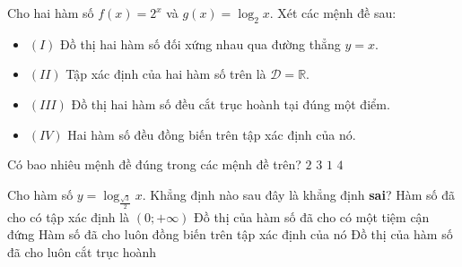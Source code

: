 \begin{ex}%
	Cho hai hàm số $f(x)=2^x$ và $g(x)=\log_2x$. Xét các mệnh đề sau:
	\begin{itemize}
		\item $(I)$ Đồ thị hai hàm số đối xứng nhau qua đường thẳng $y=x$.
		\item $\left(II\right)$ Tập xác định của hai hàm số trên là $\mathscr{D}=\mathbb{R}$.
		\item $\left(III\right)$ Đồ thị hai hàm số đều cắt trục hoành tại đúng một điểm.
		\item $\left(IV\right)$ Hai hàm số đều đồng biến trên tập xác định của nó.
	\end{itemize}
	Có bao nhiêu mệnh đề đúng trong các mệnh đề trên?
	\choice
	{\True $2$}
	{$3$}
	{$1$}
	{$4$}
\end{ex}
\begin{ex}%
	Cho hàm số $y=\log_{\tfrac{\sqrt{3}}{2}}x$. Khẳng định nào sau đây là khẳng định \textbf{sai}?
	\choice
	{Hàm số đã cho có tập xác định là $\left(0;+\infty\right)$}
	{Đồ thị của hàm số đã cho có một tiệm cận đứng}
	{\True Hàm số đã cho luôn đồng biến trên tập xác định của nó}
	{Đồ thị của hàm số đã cho luôn cắt trục hoành}
\end{ex}
